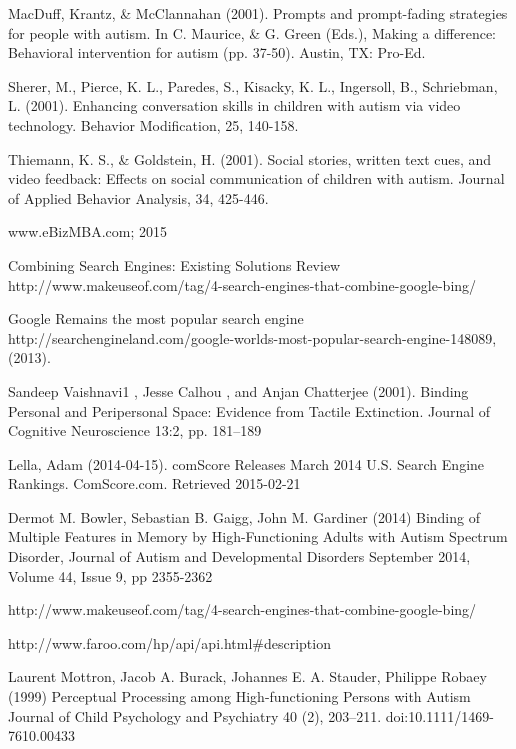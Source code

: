 \documentclass[10pt]{article}
\begin{document}
\begin{thebibliography}{100}
 MacDuff, Krantz, \& McClannahan (2001). Prompts and prompt-fading strategies for people with autism. In C. Maurice, \& G. Green (Eds.), Making a difference: Behavioral intervention for autism (pp. 37-50). Austin, TX: Pro-Ed.


Sherer, M., Pierce, K. L., Paredes, S., Kisacky, K. L., Ingersoll, B., Schriebman, L. (2001). Enhancing conversation skills in children with autism via video technology. Behavior Modification, 25, 140-158.


Thiemann, K. S., \& Goldstein, H. (2001). Social stories, written text cues, and video feedback: Effects on social communication of children with autism. Journal of Applied Behavior Analysis, 34, 425-446.

www.eBizMBA.com; 2015

Combining Search Engines: Existing Solutions Review
http://www.makeuseof.com/tag/4-search-engines-that-combine-google-bing/


Google Remains the most popular search engine http://searchengineland.com/google-worlds-most-popular-search-engine-148089, (2013).  


Sandeep Vaishnavi1 , Jesse Calhou , and Anjan Chatterjee (2001). Binding Personal and Peripersonal Space: Evidence from Tactile Extinction. Journal of Cognitive Neuroscience 13:2, pp. 181–189


Lella, Adam (2014-04-15). comScore Releases March 2014 U.S. Search Engine Rankings. ComScore.com. Retrieved 2015-02-21

Dermot M. Bowler, Sebastian B. Gaigg, John M. Gardiner (2014) Binding of Multiple Features in Memory by High-Functioning Adults with Autism Spectrum Disorder, Journal of Autism and Developmental Disorders September 2014, Volume 44, Issue 9, pp 2355-2362


 http://www.makeuseof.com/tag/4-search-engines-that-combine-google-bing/


http://www.faroo.com/hp/api/api.html\#description

 Laurent Mottron, Jacob A. Burack, Johannes E. A. Stauder, Philippe Robaey (1999) Perceptual Processing among High-functioning Persons with Autism Journal of Child Psychology and Psychiatry 40 (2), 203–211. doi:10.1111/1469-7610.00433

\end{thebibliography}
\end{document}

